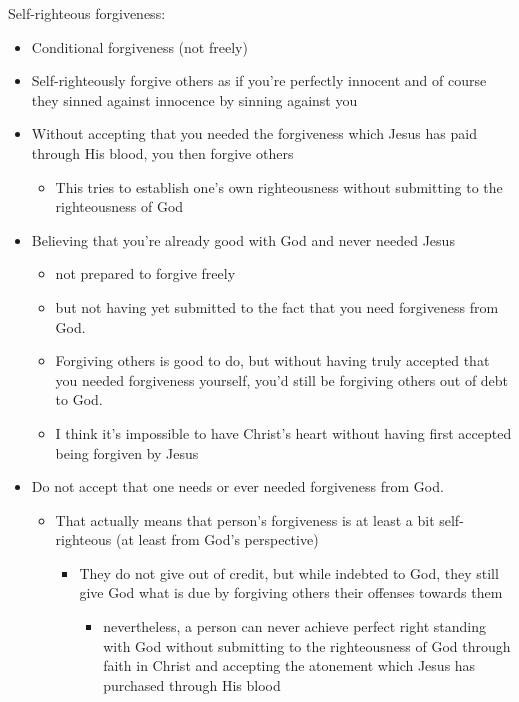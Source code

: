\documentclass[11pt]{article}
\begin{document}
Self-righteous forgiveness:
\begin{itemize}
\item Conditional forgiveness (not freely)
\item Self-righteously forgive others as if you're perfectly innocent and of course they sinned against innocence by sinning against you
\item Without accepting that you needed the forgiveness which Jesus has paid through His blood, you then forgive others
\begin{itemize}
\item This tries to establish one's own righteousness without submitting to the righteousness of God
\end{itemize}
\item Believing that you're already good with God and never needed Jesus
\begin{itemize}
\item not prepared to forgive freely
\item but not having yet submitted to the fact that you need forgiveness from God.
\item Forgiving others is good to do, but without having truly accepted that you needed forgiveness yourself, you'd still be forgiving others out of debt to God.
\item I think it's impossible to have Christ's heart without having first accepted being forgiven by Jesus
\end{itemize}
\item Do not accept that one needs or ever needed forgiveness from God.
\begin{itemize}
\item That actually means that person's forgiveness is at least a bit self-righteous (at least from God's perspective)
\begin{itemize}
\item They do not give out of credit, but while indebted to God, they still give God what is due by forgiving others their offenses towards them
\begin{itemize}
\item nevertheless, a person can never achieve perfect right standing with God without submitting to the righteousness of God through faith in Christ and accepting the atonement which Jesus has purchased through His blood
\end{itemize}
\end{itemize}
\end{itemize}
\end{itemize}
\end{document}
